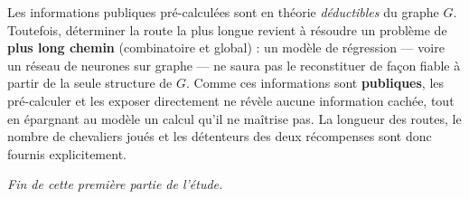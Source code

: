 \documentclass[11pt,a4paper]{article}
\begin{document}
\begin{remarque}
Les informations publiques pré-calculées sont en théorie \emph{déductibles} du graphe
$G$. Toutefois, déterminer la route la plus longue revient à résoudre un problème de
\textbf{plus long chemin} (combinatoire et global) : un modèle de régression — voire un
réseau de neurones sur graphe — ne saura pas le reconstituer de façon fiable à partir
de la seule structure de $G$. Comme ces informations sont \textbf{publiques}, les
pré-calculer et les exposer directement ne révèle aucune information cachée, tout en
épargnant au modèle un calcul qu'il ne maîtrise pas. La longueur des routes, le nombre
de chevaliers joués et les détenteurs des deux récompenses sont donc fournis
explicitement.
\end{remarque}

\vfill
\begin{center}\itshape\small
Fin de cette première partie de l'étude.
\end{center}
\end{document}
